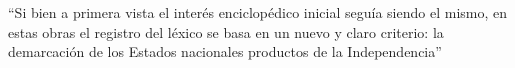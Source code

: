 \documentclass[12pt]{article}
\title{}
\makeatletter
\newcommand\iraggedright{%
	\let\\\@centercr\@rightskip\@flushglue \rightskip\@rightskip
	\leftskip\z@skip}
\makeatother
\begin{document}
	\makeheader
	\iraggedright

\enquote{Si bien a primera vista el interés enciclopédico inicial seguía siendo el mismo, en estas obras el registro del léxico se basa en un nuevo y claro criterio: la demarcación de los Estados nacionales productos de la Independencia} \cite[273]{Huisa2013}


	
	
\end{document}
